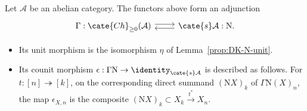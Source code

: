 \begin{lemma}\label{prop:GammaN-adjunction}
	Let $\mathcal{A}$ be an abelian category. The functors above form an
	adjunction
	\[\begin{tikzcd}
		\Gamma: \cate{Ch}_{\geq 0}(\mathcal{A}) \arrow[shift left, r] & \cate{s}\mathcal{A} : \mathrm{N} \arrow[shift left, l].
	\end{tikzcd}\]
	\begin{itemize}
		\item Its unit morphism is the isomorphism $\eta$ of
		Lemma~\ref{prop:DK-N-unit}.
		\item Its counit morphism
		$\epsilon:\Gamma\mathrm{N}\to\identity_{\cate{s}\mathcal{A}}$ is
		described as follows. For $t:[n]\twoheadrightarrow[k]$, on the
		corresponding direct summand $(\mathrm{N}X)_k$ of
		$\Gamma\mathrm{N}(X)_n$, the map $\epsilon_{X,n}$ is the composite
		$(\mathrm{N}X)_k\subset X_k\xrightarrow{t^*}X_n$.
	\end{itemize}
\end{lemma}
